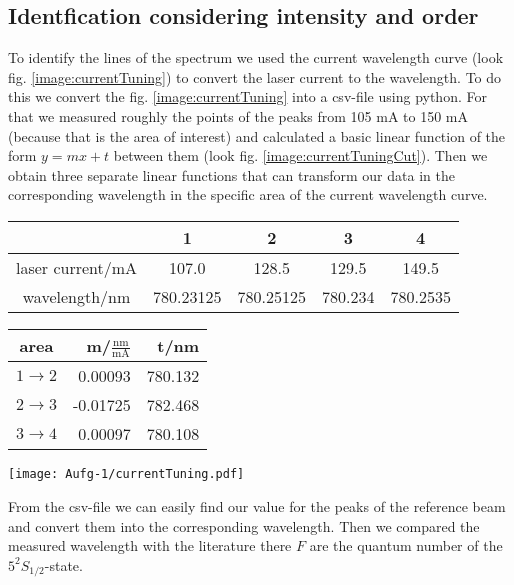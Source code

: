 \subsection*{Identfication considering intensity and order}
To identify the lines of the spectrum we used the current wavelength curve (look fig. \ref{image:currentTuning}) to convert the laser current to the wavelength. To do this we convert the fig. \ref{image:currentTuning} into a csv-file using python. For that we measured roughly the points of the peaks from 105 mA to 150 mA (because that is the area of interest) and calculated a basic linear function of the form $y=mx +t$ between them (look fig. \ref{image:currentTuningCut}). Then we obtain three separate linear functions that can transform our data in the corresponding wavelength in the specific area of the current wavelength curve.
\begin{center}
    \begin{tabular}{c | c c c c}
        {} & 1 & 2 & 3 & 4 \\
        \hline
        laser current/mA & 107.0 & 128.5 & 129.5 & 149.5\\
        wavelength/nm & 780.23125 & 780.25125 & 780.234 & 780.2535\\
    \end{tabular}
    \begin{tabular}{c | r r }
        area & m/$\frac{\text{nm}}{\text{mA}}$ & t/nm\\
        \hline
        $1 \rightarrow 2$ & 0.00093  & 780.132 \\
        $2 \rightarrow 3$ & -0.01725 & 782.468 \\
        $3 \rightarrow 4$ & 0.00097  & 780.108 \\
    \end{tabular}
\end{center}
\begin{center}
    \texttt{[image: Aufg-1/currentTuning.pdf]}
    \label{image:currentTuningCut}
\end{center}
From the csv-file we can easily find our value for the peaks of the reference beam and convert them into the corresponding wavelength. Then we compared the measured wavelength with the literature \citep{RDL85,RDL87} there $F$ are the quantum number of the $5^2S_{1/2}$-state.
